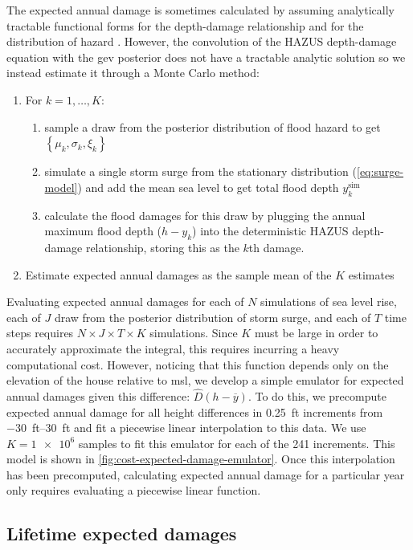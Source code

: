\documentclass[12pt]{article}
\makeatletter
\DeclareRobustCommand\onedot{\futurelet\@let@token\@onedot}
\def\@onedot{\ifx\@let@token.\else.\null\fi\xspace}
\def\eg{\emph{e.g}\onedot} \def\Eg{\emph{E.g}\onedot}
\DeclareRobustCommand\onedot{\futurelet\@let@token\@onedot}
\def\@onedot{\ifx\@let@token.\else.\null\fi\xspace}
\def\eg{\emph{e.g}\onedot} \def\Eg{\emph{E.g}\onedot}
\makeatother
\begin{document}
The expected annual damage is sometimes calculated by assuming analytically tractable functional forms for the depth-damage relationship and for the  distribution of hazard \citep[\eg][]{vandantzig_dike:1956}.
However, the convolution of the HAZUS depth-damage equation with the \gls{gev} posterior does not have a tractable analytic solution so we instead estimate it through a Monte Carlo method:
\begin{enumerate}
    \item For $k=1, \ldots, K$:
          \begin{enumerate}
              \item sample a draw from the posterior distribution of flood hazard to get $\left\{ \mu_k, \sigma_k, \xi_k \right\}$
              \item simulate a single storm surge from the stationary distribution (\cref{eq:surge-model}) and add the mean sea level to get total flood depth $y^\mathrm{sim}_k$
              \item calculate the flood damages for this draw by plugging the annual maximum flood depth ($h - y_k$) into  the deterministic HAZUS depth-damage relationship, storing this as the $k$th damage.
          \end{enumerate}
    \item Estimate expected annual damages as the sample mean of the $K$ estimates
\end{enumerate}
Evaluating expected annual damages for each of $N$ simulations of sea level rise, each of $J$ draw from the posterior distribution of storm surge, and each of $T$ time steps requires $N \times J \times T \times K$ simulations.
Since $K$ must be large in order to accurately approximate the integral, this requires incurring a heavy computational cost.
However, noticing that this function depends only on the elevation of the house relative to \gls{msl}, we develop a simple emulator for expected annual damages given this difference: $\hat{D}(h - \overline{y})$.
To do this, we  precompute expected annual damage for all height differences in \SI{0.25}{ft} increments from \SIrange{-30}{30}{ft} and fit a piecewise linear interpolation to this data.
We use $K=\num{1e6}$ samples to fit this emulator for each of the 241 increments.
This model is shown in \cref{fig:cost-expected-damage-emulator}.
Once this interpolation has been precomputed, calculating expected annual damage for a particular year only requires evaluating a piecewise linear function.

\subsection{Lifetime expected damages}\label{sec:led}
\end{document}
